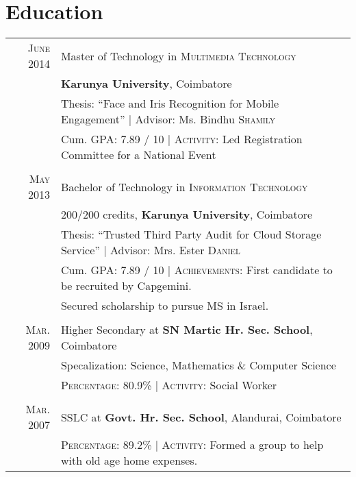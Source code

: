 \documentclass[a4paper,10pt]{article}
\begin{document}
\section{Education}
\begin{tabular}{rl}

\textsc{June} 2014 & Master of Technology in \textsc{Multimedia Technology} \\&\normalsize\textbf{Karunya University}, Coimbatore\\
& Thesis: ``Face and Iris Recognition for Mobile Engagement'' | \small Advisor: Ms. Bindhu \textsc{Shamily}\\
&\normalsize Cum. \textsc{GPA}: 7.89 / 10 | \textsc{Activity:} Led Registration Committee for a National Event
\\&\\

\textsc{May} 2013 & Bachelor of Technology in \textsc{Information Technology} \\&200/200 credits, \normalsize\textbf{Karunya University}, Coimbatore\\
& Thesis: ``Trusted Third Party Audit for Cloud Storage Service'' | \small Advisor: Mrs. Ester \textsc{Daniel}\\
&\normalsize Cum. \textsc{GPA}: 7.89 / 10 | \textsc{Achievements:} First candidate to be recruited by Capgemini.\\
&\hspace{16em} Secured scholarship to pursue MS in Israel.
\\&\\

\textsc{Mar.} 2009& Higher Secondary at \textbf{SN Martic Hr. Sec. School}, Coimbatore\\
& Specalization: Science, Mathematics \& Computer Science\\
&\textsc{Percentage}: 80.9\% | \textsc{Activity:} Social Worker
\\&\\

\textsc{Mar.} 2007& SSLC at \textbf{Govt. Hr. Sec. School}, Alandurai, Coimbatore\\
&\textsc{Percentage}: 89.2\% | \textsc{Activity:} Formed a group to help with old age home expenses.
\end{tabular}
\end{document}
